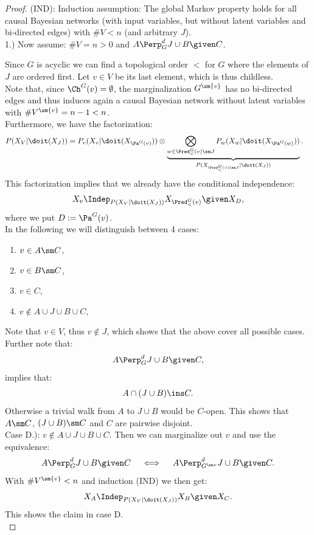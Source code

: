 \begin{Thm}
\begin{proof}
(IND): Induction assumption: 
The global Markov property holds for all causal Bayesian networks 
(with input variables, but without latent variables and bi-directed edges) 
with $\#V < n$ (and arbitrary $J$).\\

1.) Now assume: $\#V =n>0$ and $A \Perp^d_G J \cup B \given C$.

Since $G$ is acyclic we can find a topological order $<$ for $G$ where the elements of $J$ are ordered first.  
Let $v \in V$ be its last element, which is thus  childless.  \\
Note that, since $\Ch^G(v) = \emptyset$, the marginalization $G^{\sm \{v\}}$ has no bi-directed edges and thus induces again 
a causal Bayesian network without latent variables with $\#V^{\sm \{v\}}=n-1 <n$.\\
Furthermore, we have the factorization:
\begin{align*} P(X_V|\doit(X_J)) &= P_v(X_v|\doit(X_{\Pa^G(v)})) \otimes 
    \underbrace{\bigotimes_{w \in \Pred^G_<(v) \sm J} P_w(X_w|\doit(X_{\Pa^G(w)}))}_{P(X_{\Pred_<^G(v) \sm J}|\doit(X_J))}.
\end{align*}
This factorization implies that we already have the conditional independence:
\begin{align*}
    X_v \Indep_{P(X_V|\doit(X_J)) } X_{\Pred^G_<(v)} \given X_D,     \label{eq:pred}
\end{align*}
where we put $D:=\Pa^{G}(v)$.\\

In the following we will distinguish between 4 cases: 
\begin{enumerate}[label = \Alph*.)]
    \item $v \in A \sm C$,
    \item $v \in B \sm C$,
    \item $v \in C$,
    \item $ v \notin A \cup J \cup B \cup C$,
\end{enumerate}
Note that $v \in V$, thus $v \notin J$, which shows that the above cover all possible cases.\\
Further note that:
\[A \Perp^d_G J \cup B \given C,\] 
implies that:
\[ A \cap ( J \cup B) \ins C.  \]
Otherwise a trivial walk from $A$ to $J \cup B$ would be $C$-open. 
This shows that $A\sm C$, $(J \cup B) \sm C$ and $C$ are pairwise disjoint.\\


Case D.):  $v \notin A \cup J \cup B \cup C$. Then we can marginalize out $v$ and use the equivalence: 
\[A \Perp^d_{G} J \cup B \given C\quad \iff \quad A \Perp^d_{G^{\sm v}} J \cup B \given C.\]
With $\#V^{\sm \{v\}}<n$ and induction (IND) we then get:
\[X_A \Indep_{P(X_V|\doit(X_J))} X_B \given X_C.\]
This shows the claim in case D.\\


\end{proof}
\end{Thm}
